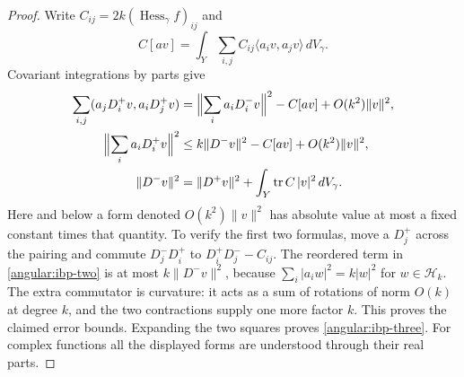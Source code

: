 \documentclass[11pt,a4paper]{article}
\DeclareMathOperator{\tr}{tr}
\numberwithin{equation}{section}
\begin{document}
\begin{proof}
Write $C_{ij}=2k(\operatorname{Hess}_\gamma f)_{ij}$ and
\[
 C[av]=\int_Y\sum_{i,j}C_{ij}\langle a_iv,a_jv\rangle\,dV_\gamma.
\]
Covariant integrations by parts give
\begin{align}
 \sum_{i,j}(a_jD_i^+v,a_iD_j^+v)
   &=\Bigl\|\sum_i a_iD_i^-v\Bigr\|^2-C[av]
                                    +O(k^2)\|v\|^2,\label{angular:ibp-one}\\
 \Bigl\|\sum_i a_iD_i^+v\Bigr\|^2
   &\le k\|D^-v\|^2-C[av]+O(k^2)\|v\|^2,\label{angular:ibp-two}\\
 \|D^-v\|^2
   &=\|D^+v\|^2+\int_Y\tr C\,|v|^2\,dV_\gamma.
                                                    \label{angular:ibp-three}
\end{align}
Here and below a form denoted $O(k^2)\|v\|^2$ has absolute value at most
a fixed constant times that quantity.  To verify the first two formulas,
move a $D_j^+$ across the pairing and commute
$D_j^-D_i^+$ to $D_i^+D_j^--C_{ij}$.  The reordered term in
\eqref{angular:ibp-two} is at most $k\|D^-v\|^2$, because
$\sum_i|a_iw|^2=k|w|^2$ for $w\in\mathcal H_k$.
The extra commutator is curvature: it acts as a sum of rotations of norm
$O(k)$ at degree $k$, and the two contractions supply one more factor $k$.
This proves the claimed error bounds.  Expanding the two squares proves
\eqref{angular:ibp-three}.  For complex functions all the displayed forms
are understood through their real parts.


\end{proof}
\end{document}
